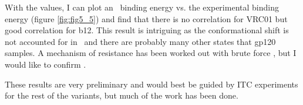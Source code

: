 With the \ec values, I can plot an \silico~binding energy vs. the experimental binding energy (figure \ref{fig:fig5_5}) and find that there is no correlation for VRC01 but good correlation for b12. This result is intriguing as the conformational shift is not accounted for in \rosetta~and there are probably many other states that gp120 samples. A mechanism of resistance has been worked out with brute force \citep{Li:2011ea}, but I would like to confirm \silico.

These results are very preliminary and would best be guided by ITC experiments for the rest of the variants, but much of the work has been done.

